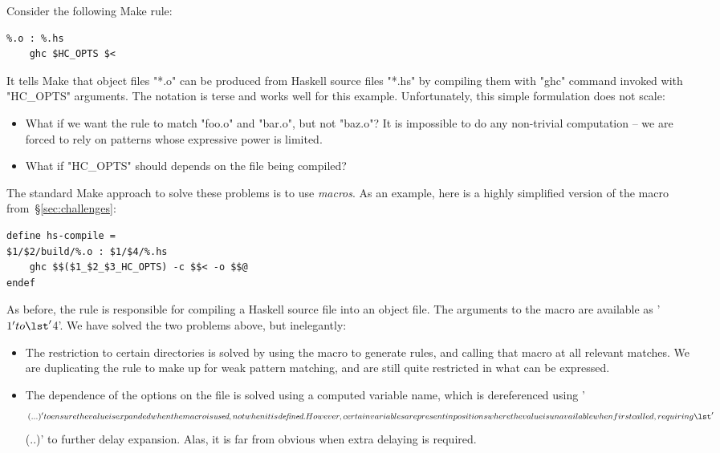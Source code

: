 Consider the following Make rule:

\begin{lstlisting}
%.o : %.hs
    ghc $HC_OPTS $<
\end{lstlisting}

\noindent It tells Make that object files \lst"*.o" can be produced from Haskell
source files \lst"*.hs" by compiling them with \lst"ghc" command invoked with
\lst"HC_OPTS" arguments. The notation is terse and works well for this example.
Unfortunately, this simple formulation does not scale:

\begin{itemize}
\item What if we want the rule to match \lst"foo.o" and \lst"bar.o", but not
\lst"baz.o"? It is impossible to do any non-trivial computation -- we are forced
to rely on patterns whose expressive power is limited.
\item What if \lst"HC_OPTS" should depends on the file being compiled?
\end{itemize}

The standard Make approach to solve these problems is to use \emph{macros}.
As an example, here is a highly simplified version of the macro from~\S\ref{sec:challenges}:

\begin{lstlisting}
define hs-compile =
$1/$2/build/%.o : $1/$4/%.hs
    ghc $$($1_$2_$3_HC_OPTS) -c $$< -o $$@
endef
\end{lstlisting}

\noindent As before, the rule is responsible for compiling a Haskell source
file into an object file. The arguments to the macro are available as \lst'$1'
to \lst'$4'. We have solved the two problems above, but inelegantly:

\begin{itemize}
\item The restriction to certain directories is solved by using the macro to generate rules, and calling that macro at all relevant matches. We are duplicating the rule to make up for weak pattern matching, and are still quite restricted in what can be expressed.
\item The dependence of the options on the file is solved using a computed variable name, which is dereferenced using \lst'$$(...)' to ensure the value is expanded when the macro is \emph{used}, not when it is \emph{defined}. However, certain variables are present in positions where the value is unavailable when first called, requiring \lst'$$$$(..)' to further delay expansion. Alas, it is far from obvious when extra delaying is required.
\end{itemize}

